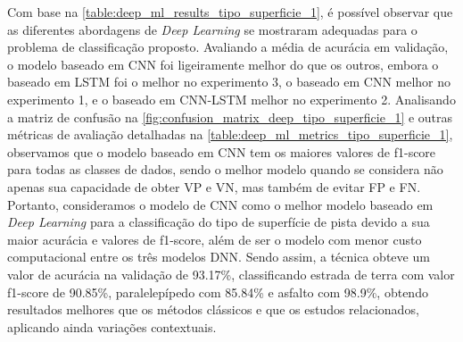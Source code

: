 Com base na \autoref{table:deep_ml_results_tipo_superficie_1}, é possível observar que as diferentes abordagens de \textit{Deep Learning} se mostraram adequadas para o problema de classificação proposto. Avaliando a média de acurácia em validação, o modelo baseado em CNN foi ligeiramente melhor do que os outros, embora o baseado em LSTM foi o melhor no experimento 3, o baseado em CNN melhor no experimento 1, e o baseado em CNN-LSTM melhor no experimento 2. Analisando a matriz de confusão na \autoref{fig:confusion_matrix_deep_tipo_superficie_1} e outras métricas de avaliação detalhadas na \autoref{table:deep_ml_metrics_tipo_superficie_1}, observamos que o modelo baseado em CNN tem os maiores valores de f1-score para todas as classes de dados, sendo o melhor modelo quando se considera não apenas sua capacidade de obter VP e VN, mas também de evitar FP e FN. Portanto, consideramos o modelo de CNN como o melhor modelo baseado em \textit{Deep Learning} para a classificação do tipo de superfície de pista devido a sua maior acurácia e valores de f1-score, além de ser o modelo com menor custo computacional entre os três modelos DNN. Sendo assim, a técnica obteve um valor de acurácia na validação de 93.17\%, classificando estrada de terra com valor f1-score de 90.85\%, paralelepípedo com 85.84\% e asfalto com 98.9\%, obtendo resultados melhores que os métodos clássicos e que os estudos relacionados, aplicando ainda variações contextuais.
